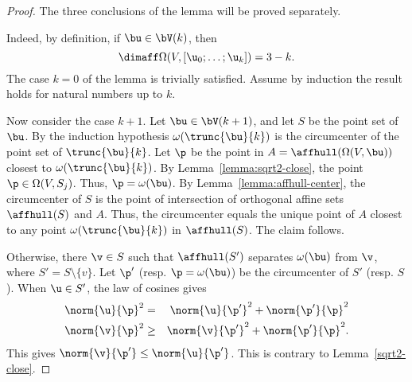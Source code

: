 \begin{proof} The three conclusions of the lemma will be proved
separately.

 Indeed, by
definition, if $\bu\in \bV(k)$, then
\begin{displaymath}
\dimaff\Omega(V,[\u_0;\ldots;\u_k]) = 3-k.
\end{displaymath}  
The case $k=0$ of the lemma is trivially
satisfied.  Assume by induction the result holds for natural numbers up to $k$.

Now consider the case $k+1$.  Let $\bu\in \bV(k+1)$, and let $S$ be
the point set of $\bu$.  By the induction hypothesis
$\omega(\trunc{\bu}{k})$ is the circumcenter of the point set of
$\trunc{\bu}{k}$.  Let $\p$ be the point in
$A=\affhull(\Omega(V,\bu))$ closest to $\omega(\trunc{\bu}{k})$.  By
Lemma~\ref{lemma:sqrt2-close}, the point $\p\in\Omega(V,S_{j})$.
Thus, $\p=\omega(\bu)$.  By Lemma~\ref{lemma:affhull-center}, the
circumcenter of $S$ is the point of intersection of orthogonal affine
sets $\affhull(S)$ and $A$.  Thus, the circumcenter equals the unique
point of $A$ closest to any point $\omega(\trunc{\bu}{k})$ in
$\affhull(S)$.  The claim follows.



Otherwise, there $\v\in S$ such that $\affhull(S')$ separates $\omega(\bu)$ from
$ \v$, where $S'=S\setminus\{v\}$.  Let $\p'$ (resp. $\p=\omega(\bu)$)
be the circumcenter
of $S'$ (resp. $S$).  When $\u\in S'$, the law of cosines gives
\begin{eqnarray*}
\norm{ \u}{\p}^2 &=& \norm{\u}{\p'}^2 + \norm{\p'}{\p}^2\\ 
\norm{ \v}{\p}^2 &\ge& \norm{\v}{\p'}^2 + \norm{\p'}{\p}^2.
\end{eqnarray*}
This gives $\norm{\v}{\p'}\le \norm{\u}{\p'}$.  This is contrary to Lemma~\ref{sqrt2-close}.


\end{proof}
